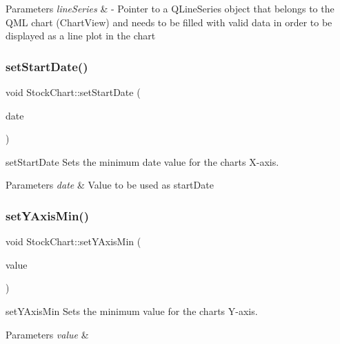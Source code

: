 \begin{DoxyParams}{Parameters}
{\em line\+Series} & -\/ Pointer to a Q\+Line\+Series object that belongs to the Q\+ML chart (Chart\+View) and needs to be filled with valid data in order to be displayed as a line plot in the chart \\
\hline
\end{DoxyParams}
\mbox{\label{class_stock_chart_abf5fe9792d1587718d89892776a7ce7a}} 
\subsubsection{\texorpdfstring{set\+Start\+Date()}{setStartDate()}}
{\footnotesize\ttfamily void Stock\+Chart\+::set\+Start\+Date (\begin{DoxyParamCaption}\item[{const Q\+String \&}]{date }\end{DoxyParamCaption})}



set\+Start\+Date Sets the minimum date value for the chart\textquotesingle{}s X-\/axis. 


\begin{DoxyParams}{Parameters}
{\em date} & Value to be used as start\+Date \\
\hline
\end{DoxyParams}
\mbox{\label{class_stock_chart_a4cfeb533f5b01e029cb25831252d8f1d}} 
\subsubsection{\texorpdfstring{set\+Y\+Axis\+Min()}{setYAxisMin()}}
{\footnotesize\ttfamily void Stock\+Chart\+::set\+Y\+Axis\+Min (\begin{DoxyParamCaption}\item[{double}]{value }\end{DoxyParamCaption})}



set\+Y\+Axis\+Min Sets the minimum value for the chart\textquotesingle{}s Y-\/axis. 


\begin{DoxyParams}{Parameters}
{\em value} & \\
\hline
\end{DoxyParams}
\mbox{\label{class_stock_chart_a7b80ba09f101dd678db485f0ebe47c79}} 
